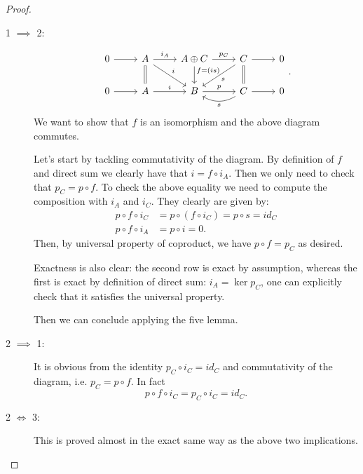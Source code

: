 \documentclass[../Main]{subfiles}
\begin{document}
\begin{proof}\leavevmode\vspace{-.2\baselineskip}
	\begin{description}
		\item[1 $\implies$ 2:]
			\begin{equation}
	\begin{tikzcd}
		0 \arrow[r, "", rightarrow] &
		A \arrow[r, "i_A", rightarrow] \arrow[d, "", equals] \arrow[rd, "i", rightarrow] &
		A \oplus C \arrow[r, "p_C", rightarrow]
		\arrow[d, "f =(i s)" near start, rightarrow] &
		C \arrow[r, "", rightarrow] \arrow[d, "", equals] \arrow[ld, "s", rightarrow] &
		0 \\
		0 \arrow[r, "", rightarrow] &
		A \arrow[r, "i", rightarrow] &
		B \arrow[r, "p", rightarrow] &
		C \arrow[r, "", rightarrow]  \arrow[l, "s", bend left, rightarrow] &
		0 
	\end{tikzcd}
	.\end{equation} 
	We want to show that $f$ is an isomorphism and the above diagram commutes.

	Let's start by tackling commutativity of the diagram.
	By definition of $f$ and direct sum we clearly have that $i = f \circ i_A$.
	Then we only need to check that $p_C = p \circ f$.
	To check the above equality we need to compute the composition with $i_A$ and $i_C$.
	They clearly are given by:
	\begin{align}
		p \circ f \circ i_C &= p \circ \left( f \circ i_C \right) = p \circ s = id_C\\
		p \circ f \circ i_A &= p \circ i = 0
	.\end{align} 
	Then, by universal property of coproduct, we have $p \circ f = p_C$ as desired.

	Exactness is also clear: the second row is exact by assumption,
	whereas the first is exact by definition of direct sum: $i_A = \ker p_C$,
	one can explicitly check that it satisfies the universal property.

	Then we can conclude applying the five lemma.
\item[2 $\implies$ 1:]
	It is obvious from the identity $p_C \circ i_C = id_C$
	and commutativity of the diagram, i.e. $p_C = p \circ f$.
	In fact
	\begin{equation}
	p \circ f \circ i_C = p_C \circ i_C = id_C
	.\end{equation} 
\item[2 $\iff$ 3:] This is proved almost in the exact same way as the above two implications.
	\qedhere
	\end{description} 
\end{proof}
\end{document}
